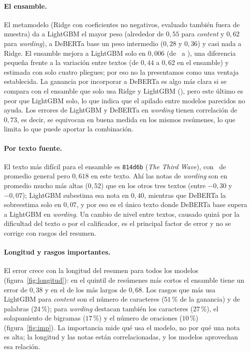 \paragraph{El ensamble.} El metamodelo (Ridge con coeficientes no negativos, evaluado también fuera de muestra) da a LightGBM el mayor peso (alrededor de $0{,}55$ para \emph{content} y $0{,}62$ para \emph{wording}), a DeBERTa base un peso intermedio ($0{,}28$ y $0{,}36$) y casi nada a Ridge. El ensamble mejora a LightGBM solo en $0{,}006$ (de \mclgbmenriquecido\ a \mcensamble), una diferencia pequeña frente a la variación entre textos (de $0{,}44$ a $0{,}62$ en el ensamble) y estimada con solo cuatro pliegues; por eso no la presentamos como una ventaja establecida. La ganancia por incorporar a DeBERTa es algo más clara si se compara con el ensamble que solo usa Ridge y LightGBM (\mcensamblerasgos), pero este último es peor que LightGBM solo, lo que indica que el apilado entre modelos parecidos no ayuda. Los errores de LightGBM y DeBERTa en \emph{wording} tienen correlación de $0{,}73$, es decir, se equivocan en buena medida en los mismos resúmenes, lo que limita lo que puede aportar la combinación.

\paragraph{Por texto fuente.} El texto más difícil para el ensamble es \texttt{814d6b} (\textit{The Third Wave}), con \mcensamble\ de promedio general pero $0{,}618$ en este texto. Ahí las notas de \emph{wording} son en promedio mucho más altas ($0{,}52$) que en los otros tres textos (entre $-0{,}30$ y $-0{,}07$); LightGBM subestima esa nota en $0{,}40$, mientras que DeBERTa la sobreestima solo en $0{,}07$, y por eso es el único texto donde DeBERTa base supera a LightGBM en \emph{wording}. Un cambio de nivel entre textos, causado quizá por la dificultad del texto o por el calificador, es el principal factor de error y no se corrige con rasgos del resumen.

\paragraph{Longitud y rasgos importantes.} El error crece con la longitud del resumen para todos los modelos (figura~\ref{fig:longitud}): en el quintil de resúmenes más cortos el ensamble tiene un error de $0{,}38$ y en el de los más largos de $0{,}68$. Los rasgos que más usa LightGBM para \emph{content} son el número de caracteres ($51\,\%$ de la ganancia) y de palabras ($24\,\%$); para \emph{wording} destacan también los caracteres ($27\,\%$), el solapamiento de bigramas ($17\,\%$) y el número de oraciones ($10\,\%$) (figura~\ref{fig:imp}). La importancia mide qué usa el modelo, no por qué una nota es alta; la longitud y las notas están correlacionadas, y los modelos aprovechan esa relación.

